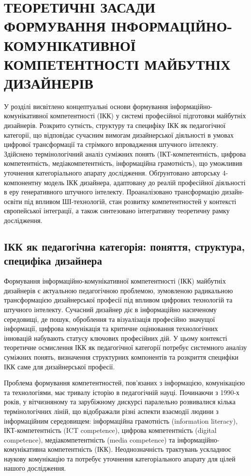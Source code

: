 \section{ТЕОРЕТИЧНІ ЗАСАДИ ФОРМУВАННЯ ІНФОРМАЦІЙНО-КОМУНІКАТИВНОЇ КОМПЕТЕНТНОСТІ МАЙБУТНІХ ДИЗАЙНЕРІВ}\label{sec:1}

У розділі висвітлено концептуальні основи формування інформаційно-комунікативної компетентності (ІКК) у системі професійної підготовки майбутніх дизайнерів. Розкрито сутність, структуру та специфіку ІКК як педагогічної категорії, що відповідає сучасним вимогам дизайнерської діяльності в умовах цифрової трансформації та стрімкого впровадження штучного інтелекту. Здійснено термінологічний аналіз суміжних понять (ІКТ-компетентність, цифрова компетентність, медіакомпетентність, інформаційна грамотність), що уможливив уточнення категоріального апарату дослідження. Обґрунтовано авторську 4-компонентну модель ІКК дизайнера, адаптовану до реалій професійної діяльності в еру генеративного штучного інтелекту. Проаналізовано трансформацію дизайн-освіти під впливом ШІ-технологій, стан розвитку компетентностей у контексті європейської інтеграції, а також синтезовано інтегративну теоретичну рамку дослідження.

\subsection{ІКК як педагогічна категорія: поняття, структура, специфіка дизайнера}\label{subsec:1.1}

Формування інформаційно-комунікативної компетентності (ІКК) майбутніх дизайнерів є актуальною педагогічною проблемою, зумовленою радикальною трансформацією дизайнерської професії під впливом цифрових технологій та штучного інтелекту. Сучасний дизайнер діє в інформаційно насиченому середовищі, де пошук, оброблення та візуалізація професійно значущої інформації, цифрова комунікація та критичне оцінювання технологічних інновацій набувають статусу ключових професійних дій. У цьому контексті теоретичне осмислення ІКК як педагогічної категорії потребує системного аналізу суміжних понять, визначення структурних компонентів та розкриття специфіки ІКК саме для дизайнерської професії.

Проблема формування компетентностей, пов'язаних з інформацією, комунікацією та технологіями, має тривалу історію в педагогічній науці. Починаючи з 1990-х років, у вітчизняному та зарубіжному дискурсі паралельно розвивалися кілька термінологічних ліній, що відображали різні аспекти взаємодії людини з інформаційним середовищем: інформаційна грамотність (information literacy), ІКТ-компетентність (ICT competence), цифрова компетентність (digital competence), медіакомпетентність (media competence) та інформаційно-комунікативна компетентність (ІКК). Неоднозначність трактувань ускладнює наукову комунікацію та потребує уточнення категоріального апарату для цілей нашого дослідження.

